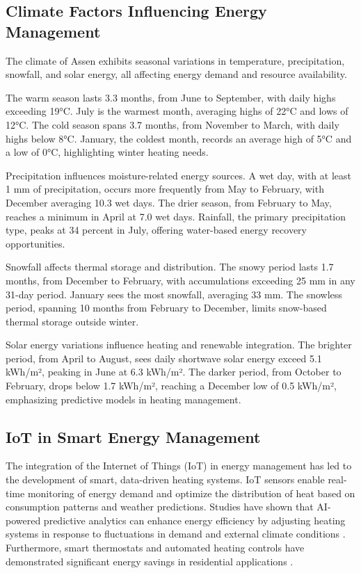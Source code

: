 \documentclass{article}
\begin{document}
\subsection{Climate Factors Influencing Energy Management}
The climate of Assen exhibits seasonal variations in temperature, precipitation, snowfall, and solar energy, all affecting energy demand and resource availability.

The warm season lasts 3.3 months, from June to September, with daily highs exceeding 19°C. July is the warmest month, averaging highs of 22°C and lows of 12°C. The cold season spans 3.7 months, from November to March, with daily highs below 8°C. January, the coldest month, records an average high of 5°C and a low of 0°C, highlighting winter heating needs. \cite{weatherspark_assen}

Precipitation influences moisture-related energy sources. A wet day, with at least 1 mm of precipitation, occurs more frequently from May to February, with December averaging 10.3 wet days. The drier season, from February to May, reaches a minimum in April at 7.0 wet days. Rainfall, the primary precipitation type, peaks at 34 percent in July, offering water-based energy recovery opportunities. \cite{weatherspark_assen}

Snowfall affects thermal storage and distribution. The snowy period lasts 1.7 months, from December to February, with accumulations exceeding 25 mm in any 31-day period. January sees the most snowfall, averaging 33 mm. The snowless period, spanning 10 months from February to December, limits snow-based thermal storage outside winter. \cite{weatherspark_assen}

Solar energy variations influence heating and renewable integration. The brighter period, from April to August, sees daily shortwave solar energy exceed 5.1 kWh/m², peaking in June at 6.3 kWh/m². The darker period, from October to February, drops below 1.7 kWh/m², reaching a December low of 0.5 kWh/m², emphasizing predictive models in heating management. \cite{weatherspark_assen}


\subsection{IoT in Smart Energy Management}
The integration of the Internet of Things (IoT) in energy management has led to the development of smart, data-driven heating systems. IoT sensors enable real-time monitoring of energy demand and optimize the distribution of heat based on consumption patterns and weather predictions. Studies have shown that AI-powered predictive analytics can enhance energy efficiency by adjusting heating systems in response to fluctuations in demand and external climate conditions \cite{ai_energy}. Furthermore, smart thermostats and automated heating controls have demonstrated significant energy savings in residential applications \cite{smart_heating}.
\end{document}

